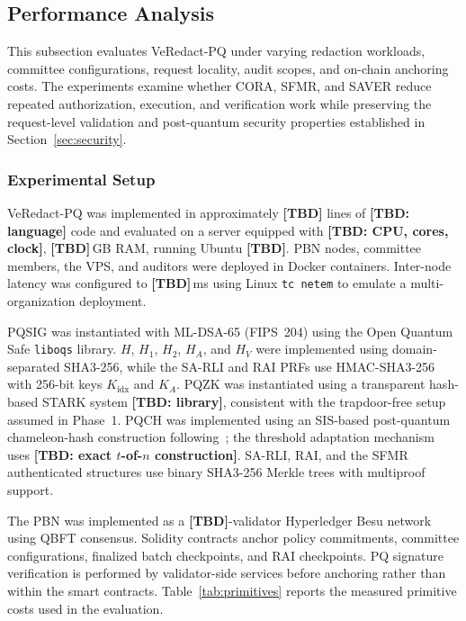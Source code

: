 \documentclass[lettersize,journal]{IEEEtran}
\begin{document}

\subsection{Performance Analysis}
\label{subsec:performance-analysis}

This subsection evaluates VeRedact-PQ under varying redaction
workloads, committee configurations, request locality, audit scopes,
and on-chain anchoring costs. The experiments examine whether CORA,
SFMR, and SAVER reduce repeated authorization, execution, and
verification work while preserving the request-level validation and
post-quantum security properties established in
Section~\ref{sec:security}.

\subsubsection{Experimental Setup}

VeRedact-PQ was implemented in approximately \textbf{[TBD]} lines of
\textbf{[TBD: language]} code and evaluated on a server equipped with
\textbf{[TBD: CPU, cores, clock]}, \textbf{[TBD]}\,GB RAM, running
Ubuntu \textbf{[TBD]}. PBN nodes, committee members, the VPS, and
auditors were deployed in Docker containers. Inter-node latency was
configured to \textbf{[TBD]}\,ms using Linux \texttt{tc netem} to
emulate a multi-organization deployment.

PQSIG was instantiated with ML-DSA-65 (FIPS~204) using the Open
Quantum Safe \texttt{liboqs} library. $H$, $H_1$, $H_2$, $H_A$, and
$H_V$ were implemented using domain-separated SHA3-256, while the
SA-RLI and RAI PRFs use HMAC-SHA3-256 with 256-bit keys
$K_{\mathrm{idx}}$ and $K_A$. PQZK was instantiated using a
transparent hash-based STARK system \textbf{[TBD: library]},
consistent with the trapdoor-free setup assumed in Phase~1. PQCH was
implemented using an SIS-based post-quantum chameleon-hash construction
following~\cite{ref10,ref17}; the threshold adaptation mechanism uses
\textbf{[TBD: exact $t$-of-$n$ construction]}. SA-RLI, RAI, and the
SFMR authenticated structures use binary SHA3-256 Merkle trees with
multiproof support.

The PBN was implemented as a \textbf{[TBD]}-validator Hyperledger Besu
network using QBFT consensus. Solidity contracts anchor policy
commitments, committee configurations, finalized batch checkpoints,
and RAI checkpoints. PQ signature verification is performed by
validator-side services before anchoring rather than within the smart
contracts. Table~\ref{tab:primitives} reports the measured primitive
costs used in the evaluation.
\end{document}
